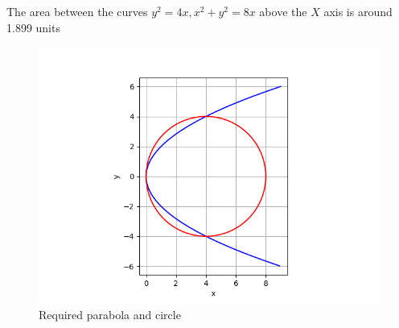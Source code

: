 \documentclass[journal]{IEEEtran}
\begin{document}
The area between the curves $y^2=4x, x^2+y^2=8x$ above the $X$ axis is around 1.899 units
\begin{figure}[h!]
   \centering
   \includegraphics[width = 1\linewidth]{figs/fig.png}
   \caption{Required parabola and circle}
   \label{stemplot}
\end{figure}
\end{document}
